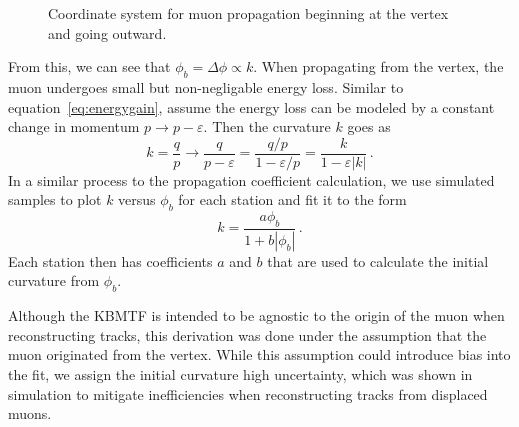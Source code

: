 \begin{figure}[htb!]
	\centering
	
	\caption[Coordinate system for muon propagation beginning at the vertex and going outward.]{Coordinate system for muon propagation beginning at the vertex and going outward.}
	\label{fig:mu_prop_vertex}
\end{figure}
From this, we can see that $\phi_b=\Delta\phi\propto k$. When propagating from the vertex, the muon undergoes small but non-negligable energy loss. Similar to equation~\ref{eq:energygain}, assume the energy loss can be modeled by a constant change in momentum $p\to p-\varepsilon$. Then the curvature $k$ goes as
\begin{equation}
	\label{eq:energyloss}
	k=\frac{q}{p}\to\frac{q}{p-\varepsilon}=\frac{q/p}{1-\varepsilon/p}=\frac{k}{1-\varepsilon |k|}\,.
\end{equation}
In a similar process to the propagation coefficient calculation, we use simulated samples to plot $k$ versus $\phi_b$ for each station and fit it to the form
\begin{equation}
	k=\frac{a\phi_b}{1+b|\phi_b|}\,.
\end{equation}
Each station then has coefficients $a$ and $b$ that are used to calculate the initial curvature from $\phi_b$.

Although the KBMTF is intended to be agnostic to the origin of the muon when reconstructing tracks, this derivation was done under the assumption that the muon originated from the vertex. While this assumption could introduce bias into the fit, we assign the initial curvature high uncertainty, which was shown in simulation to mitigate inefficiencies when reconstructing tracks from displaced muons.

